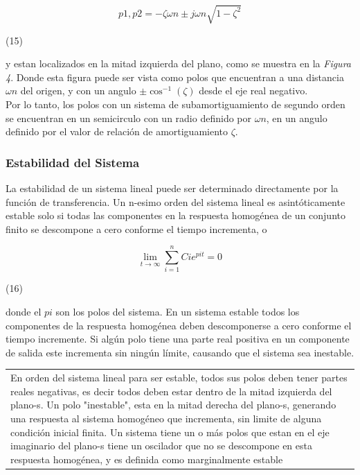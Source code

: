 \documentclass[10pt,a4paper]{article}
\begin{document}
\begin{center}
  \[p{\scriptscriptstyle 1},p{\scriptscriptstyle 2}=-\zeta\omega{\scriptscriptstyle n}\pm j\omega{\scriptscriptstyle n}\sqrt{1-\zeta^{2}}\]
  \begin{minipage}{0.9\textwidth}
    \begin{flushright}
        (15)
    \end{flushright}
  \end{minipage}
\end{center}
y estan localizados en la mitad izquierda del plano, como se muestra en la \textit{Figura 4}. Donde esta figura puede ser vista como polos que encuentran a una distancia $\omega{\scriptscriptstyle n}$ del origen, y con un angulo $\pm\cos^{-1}(\zeta)$ desde el eje real negativo.\\
Por lo tanto, los polos con un sistema de subamortiguamiento de segundo orden se encuentran en un semicirculo con un radio definido por $\omega{\scriptscriptstyle n}$, en un angulo definido por el valor de relación de amortiguamiento $\zeta$.
\subsubsection{Estabilidad del Sistema}
La estabilidad de un sistema lineal puede ser determinado directamente por la función de transferencia. Un n-esimo orden del sistema lineal es asintóticamente estable solo si todas las componentes en la respuesta homogénea de un conjunto finito se descompone a cero conforme el tiempo incrementa, o
\begin{center}
  \[ \lim_{t \to \infty} \sum_{i=1}^n C{\scriptscriptstyle i}e^{p{\scriptscriptstyle i}t}=0\]
  \begin{minipage}{0.9\textwidth}
    \begin{flushright}
        (16)
    \end{flushright}
  \end{minipage}
\end{center}
donde el $p{\scriptscriptstyle i}$ son los polos del sistema. En un sistema estable todos los componentes de la respuesta homogénea deben descomponerse a cero conforme el tiempo incremente. Si algún polo tiene una parte real positiva en un componente de salida este incrementa sin ningún límite, causando que el sistema sea inestable.
\begin{center}
  \begin{tabular}{p{16cm}}
    En orden del sistema lineal para ser estable, todos sus polos deben tener partes reales negativas, es decir todos deben estar dentro de la mitad izquierda del plano-s. Un polo "inestable", esta en la mitad derecha del plano-s, generando una respuesta al sistema homogéneo que incrementa, sin limite de alguna condición inicial finita. Un sistema tiene un o más polos que estan en el eje imaginario del plano-s tiene un oscilador que no se descompone en esta respuesta homogénea, y es definida como marginalmente estable
  \end{tabular}
\end{center}
\end{document}
